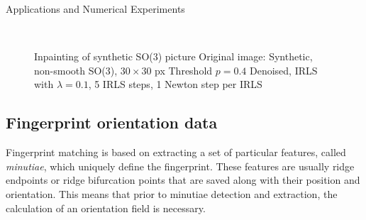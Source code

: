 \begin{chapter}{Applications and Numerical Experiments}
\begin{figure}[h!]
    \centering
    \\
    \caption[Inpainting of synthetic SO(3) picture]{Inpainting of synthetic SO(3) picture
	 Original image: Synthetic, non-smooth SO(3), $30\times 30$ px
	 Threshold $p=0.4$
	 Denoised, IRLS with $\lambda=0.1$, 5 IRLS steps, 1 Newton step per IRLS
	\label{fig:application_so1}
    }
\end{figure}


\FloatBarrier
\subsection{Fingerprint orientation data} %
\label{sub:Fingerprint orientation data}
Fingerprint matching is  based on extracting a set of particular features, called \emph{minutiae}, which uniquely define the fingerprint.
These features are usually ridge endpoints or ridge bifurcation points that are saved along with their position and orientation. This
means that prior to minutiae detection and extraction, the calculation of an orientation field is necessary.\\


\end{chapter}
